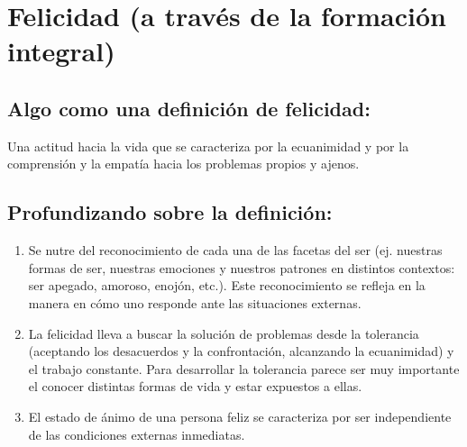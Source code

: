 \documentclass[10pt,letterpaper,oneside]{book}
\begin{document}
	\section{Felicidad (a través de la formación integral)} 

		\subsection*{Algo como una definición de felicidad:}
		Una actitud hacia la vida que se caracteriza por la ecuanimidad y por la comprensión y la empatía hacia los problemas propios y ajenos.
		\subsection*{Profundizando sobre la definición:} 
		\begin{enumerate}[label=\alph*]
		\item Se nutre del reconocimiento de cada una de las facetas del ser (ej. nuestras formas de ser, nuestras emociones y nuestros patrones en distintos contextos: ser apegado, amoroso, enojón, etc.). Este reconocimiento se refleja en la manera en cómo uno responde ante las situaciones externas.
\item La felicidad lleva a buscar la solución de problemas desde la tolerancia (aceptando los desacuerdos y la confrontación, alcanzando la ecuanimidad)  y el trabajo constante. Para desarrollar la tolerancia parece ser muy importante el conocer distintas formas de vida y estar expuestos a ellas.
\item El estado de ánimo de una persona feliz se caracteriza por ser independiente de las condiciones externas inmediatas.
		\end{enumerate}
\end{document}
